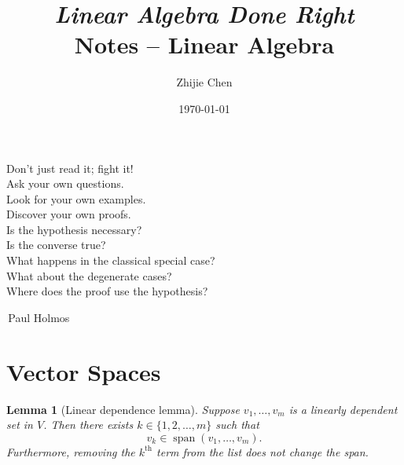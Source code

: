 \documentclass[colorlinks]{tufte-handout}
\title{	
	\normalfont\normalsize 
	{\itshape Linear Algebra Done Right} \\ [0pt]
	\huge Notes -- Linear Algebra
}
\author{Zhijie Chen}
\date{\vspace{-5pt}\normalsize\today}
\theoremstyle{plain} %
\newtheorem{lem}[thm]{Lemma}
\theoremstyle{definition}
\newtheorem{notns}[thm]{Notations}
\theoremstyle{remark}
\newcommand{\F}{\mathbb{F}}
\DeclareMathOperator{\spn}{span}
\begin{document}
\justifying
\maketitle
\tableofcontents
\newpage

\thispagestyle{empty}
\begin{fullwidth}
	\Large
	\vspace*{\fill}
	\begin{center}
		Don't just read it; fight it!\\
		Ask your own questions.\\
		Look for your own examples.\\
		Discover your own proofs.\\
		Is the hypothesis necessary?\\
		Is the converse true?\\
		What happens in the classical special case?\\
		What about the degenerate cases?\\
		Where does the proof use the hypothesis?
	\end{center}
	\begin{flushright}
		\textemdash\,Paul Holmos\phantom{placeholderrrrrr}
	\end{flushright}
	\vspace*{\fill}
\end{fullwidth}
\newpage





\section{Vector Spaces}
\begin{lem}[Linear dependence lemma]
	Suppose $v_1,\dots,v_m$ is a linearly dependent set in $V$. Then there exists $k\in\{1,2,\dots,m\}$ such that
	\[v_k\in\spn(v_1,\dots,v_m).\]
	Furthermore, removing the $k^\text{th}$ term from the list does not change the span.
\end{lem}
\end{document}
